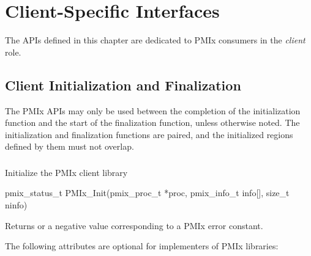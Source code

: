 \chapter{Client-Specific Interfaces}
\label{chap:api_init}

The \acp{API} defined in this chapter are dedicated to \ac{PMIx} consumers in the \emph{client} role.

\section{Client Initialization and Finalization}
\label{chap:api_init:client}

The \ac{PMIx} \acp{API} may only be used between the completion of the initialization function and the start of the finalization function, unless otherwise noted.
The initialization and finalization functions are paired, and the initialized regions defined by them must not overlap.


\subsection{}

\summary

Initialize the \ac{PMIx} client library

\format

\cspecificstart
\begin{codepar}
pmix_status_t
PMIx_Init(pmix_proc_t *proc,
          pmix_info_t info[], size_t ninfo)
\end{codepar}
\cspecificend

\begin{arglist}
\end{arglist}

Returns  or a negative value corresponding to a \ac{PMIx} error constant.

\optattrstart
The following attributes are optional for implementers of \ac{PMIx} libraries:

